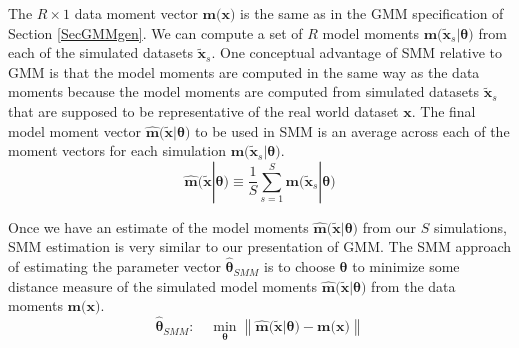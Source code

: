 \documentclass[letterpaper,12pt]{article}
\theoremstyle{definition}
\newcommand\norm[1]{\left\lVert#1\right\rVert}
\begin{document}
    The $R\times 1$ data moment vector $\bm{m}\bigl(\bm{x}\bigr)$ is the same as in the GMM specification of Section \ref{SecGMMgen}. We can compute a set of $R$ model moments $\bm{m}\bigl(\bm{\tilde{x}}_s|\bm{\theta}\bigr)$ from each of the simulated datasets $\bm{\tilde{x}}_s$. One conceptual advantage of SMM relative to GMM is that the model moments are computed in the same way as the data moments because the model moments are computed from simulated datasets $\bm{\tilde{x}}_s$ that are supposed to be representative of the real world dataset $\bm{x}$. The final model moment vector $\bm{\hat{m}}\bigl(\bm{\tilde{x}}|\bm{\theta}\bigr)$ to be used in SMM is an average across each of the moment vectors for each simulation $\bm{m}\bigl(\bm{\tilde{x}}_s|\bm{\theta}\bigr)$.
    \begin{equation}\label{EqSMMmodmomgen}
      \bm{\hat{m}}\bigl(\bm{\tilde{x}}|\bm{\theta}\bigr) \equiv \frac{1}{S}\sum_{s=1}^S\bm{m}\bigl(\bm{\tilde{x}}_s|\bm{\theta}\bigr)
    \end{equation}

    Once we have an estimate of the model moments $\bm{\hat{m}}\bigl(\bm{\tilde{x}}|\bm{\theta}\bigr)$ from our $S$ simulations, SMM estimation is very similar to our presentation of GMM. The SMM approach of estimating the parameter vector $\bm{\hat{\theta}}_{SMM}$ is to choose $\bm{\theta}$ to minimize some distance measure of the simulated model moments $\bm{\hat{m}}\bigl(\bm{\tilde{x}}|\bm{\theta}\bigr)$ from the data moments $\bm{m}\bigl(\bm{x}\bigr)$.
    \begin{equation}\label{EqSMMdefgen}
      \bm{\hat{\theta}}_{SMM}:\quad \min_{\bm{\theta}}\norm{\bm{\hat{m}}\bigl(\bm{\tilde{x}}|\bm{\theta}\bigr) - \bm{m}\bigl(\bm{x}\bigr)}
    \end{equation}
\end{document}
